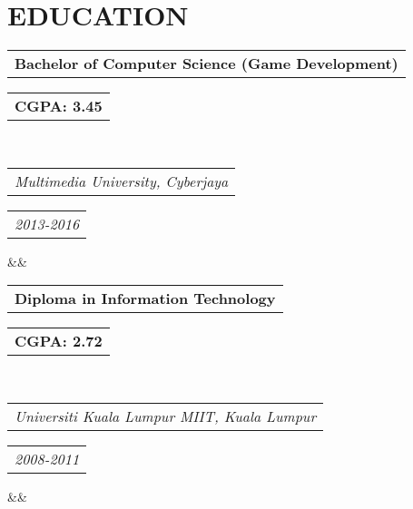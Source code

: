 \documentclass[11pt,a4paper,roman]{moderncv}        %
\makeatletter
\newcommand*{\customcventry}[7][.3em]{
    \begin{tabular}{@{}l} 
        {\bfseries #2}
    \end{tabular}
    \hfill%
    \begin{tabular}{l@{}}
        {\bfseries #4}
    \end{tabular} \\
    \begin{tabular}{@{}l} 
        {\itshape #3}
    \end{tabular}
    \hfill%
    \begin{tabular}{l@{}}
        {\itshape #5}
    \end{tabular}
    \ifx&#7&
    \else{\\
        \begin{minipage}{\maincolumnwidth}
            \small#7
        \end{minipage}}\fi
    \par\addvspace{#1}
}
\makeatother
\begin{document}
\section{EDUCATION}
{\customcventry{Bachelor of Computer Science (Game Development)}{Multimedia University, Cyberjaya}{CGPA: 3.45}{2013-2016}{}{}}
{\customcventry{Diploma in Information Technology}{Universiti Kuala Lumpur MIIT, Kuala Lumpur}{CGPA: 2.72}{2008-2011}{}{}}
\end{document}
